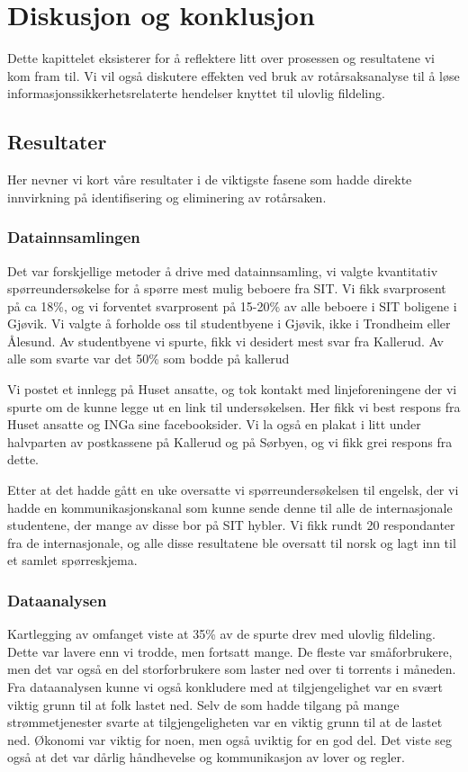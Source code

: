 \chapter{Diskusjon og konklusjon}
Dette kapittelet eksisterer for å reflektere litt over prosessen og resultatene vi kom fram til. Vi vil også diskutere effekten ved bruk av rotårsaksanalyse til å løse informasjonssikkerhetsrelaterte hendelser knyttet til ulovlig fildeling. 

\section{Resultater}
Her nevner vi kort våre resultater i de viktigste fasene som hadde direkte innvirkning på identifisering og eliminering av rotårsaken. 

\subsection{Datainnsamlingen}
Det var forskjellige metoder å drive med datainnsamling, vi valgte kvantitativ spørreundersøkelse for å spørre mest mulig beboere fra SIT. Vi fikk svarprosent på ca 18\%, og vi forventet svarprosent på 15-20\% av alle beboere i SIT boligene i Gjøvik. Vi valgte å forholde oss til studentbyene i Gjøvik, ikke i Trondheim eller Ålesund. Av studentbyene vi spurte, fikk vi desidert mest svar fra Kallerud. Av alle som svarte var det 50\% som bodde på kallerud

Vi postet et innlegg på Huset ansatte, og tok kontakt med linjeforeningene der vi spurte om de kunne legge ut en link til undersøkelsen. Her fikk vi best respons fra Huset ansatte og INGa sine facebooksider. Vi la også en plakat i litt under halvparten av postkassene på Kallerud og på Sørbyen, og vi fikk grei respons fra dette.

Etter at det hadde gått en uke oversatte vi spørreundersøkelsen til engelsk, der vi hadde en kommunikasjonskanal som kunne sende denne til alle de internasjonale studentene, der mange av disse bor på SIT hybler. Vi fikk rundt 20 respondanter fra de internasjonale, og alle disse resultatene ble oversatt til norsk og lagt inn til et samlet spørreskjema.


\subsection{Dataanalysen}
Kartlegging av omfanget viste at 35\% av de spurte drev med ulovlig fildeling. Dette var lavere enn vi trodde, men fortsatt mange. De fleste var småforbrukere, men det var også en del storforbrukere som laster ned over ti torrents i måneden. Fra dataanalysen kunne vi også konkludere med at tilgjengelighet var en svært viktig grunn til at folk lastet ned. Selv de som hadde tilgang på mange strømmetjenester svarte at tilgjengeligheten var en viktig grunn til at de lastet ned. Økonomi var viktig for noen, men også uviktig for en god del. Det viste seg også at det var dårlig håndhevelse og kommunikasjon av lover og regler. 

